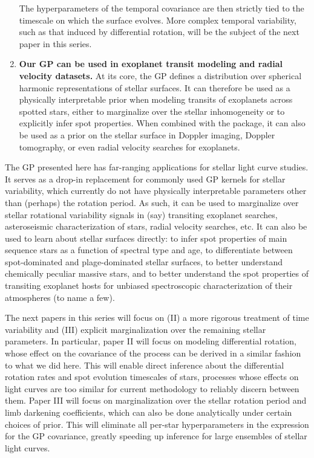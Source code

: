 \documentclass[modern]{aastex62}
\begin{document}
\begin{enumerate}
          The hyperparameters of the temporal covariance are then strictly
          tied to the timescale on which the surface evolves. More
          complex temporal variability, such as that induced by differential
          rotation, will be the subject of the next paper in this series.
    \item \textbf{Our GP can be used in exoplanet transit modeling and
              radial velocity datasets.} At its core, the \starryprocess GP
          defines a distribution over spherical harmonic representations
          of stellar surfaces. It can therefore be used as a physically
          interpretable prior when modeling transits of exoplanets across
          spotted stars, either to marginalize over the stellar inhomogeneity
          or to explicitly infer spot properties. When combined with the
          \starry package, it can also be used as a
          prior on the stellar surface in Doppler imaging, Doppler tomography,
          or even radial velocity searches for exoplanets.
\end{enumerate}

The GP presented here has far-ranging applications for stellar light
curve studies. It serves as a drop-in replacement for commonly used
GP kernels for stellar variability, which currently do not have
physically interpretable parameters other than (perhaps) the rotation
period. As such, it can be used to marginalize over stellar rotational variability
signals in (say) transiting exoplanet searches, asteroseismic characterization
of stars, radial velocity searches, etc. It can also be used to learn
about stellar surfaces directly: to infer spot properties of main sequence
stars as a function of spectral type and age, to differentiate between
spot-dominated and plage-dominated stellar surfaces, to better understand
chemically peculiar massive stars, and to better understand the spot
properties of transiting exoplanet hosts for unbiased spectroscopic
characterization of their atmospheres (to name a few).

The next papers in this series will focus on (II) a more rigorous
treatment of time variability and (III) explicit marginalization over
the remaining stellar parameters. In particular, paper II will focus
on modeling differential rotation, whose effect on the covariance of the
process can be derived in a similar fashion to what we did here. This
will enable direct inference about the differential rotation rates and
spot evolution timescales of stars, processes whose effects on light curves
are too similar for current methodology to reliably discern between them.
Paper III will focus on marginalization over the stellar rotation period
and limb darkening coefficients, which can also be done analytically
under certain choices of prior. This will eliminate all per-star
hyperparameters in the expression for the GP covariance, greatly
speeding up inference for large ensembles of stellar light curves.
\end{document}
